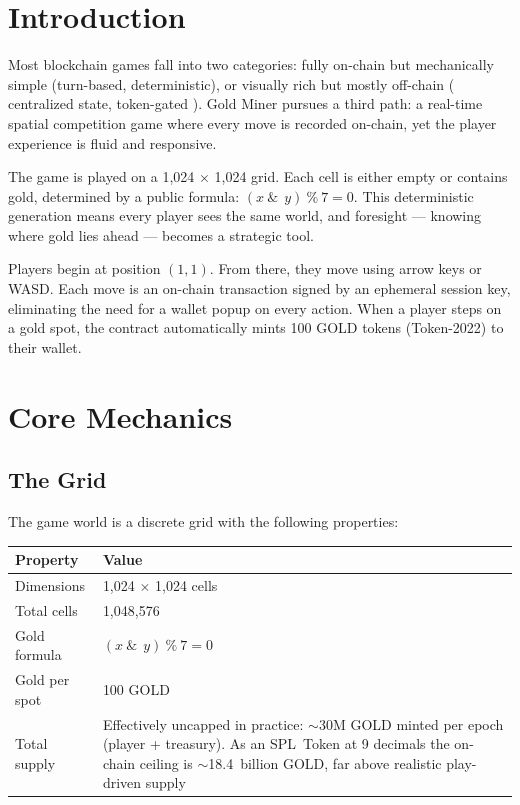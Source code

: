 \documentclass[11pt,a4paper]{article}
\begin{document}
\section{Introduction}

Most blockchain games fall into two categories: fully on-chain but mechanically simple (turn-based, deterministic), or visually rich but mostly off-chain ( centralized state, token-gated ). Gold Miner pursues a third path: a real-time spatial competition game where every move is recorded on-chain, yet the player experience is fluid and responsive.

The game is played on a 1,024 $\times$ 1,024 grid. Each cell is either empty or contains gold, determined by a public formula: $(x \ \&\ \ y) \ \% \ 7 = 0$. This deterministic generation means every player sees the same world, and foresight --- knowing where gold lies ahead --- becomes a strategic tool.

Players begin at position $(1,1)$. From there, they move using arrow keys or WASD. Each move is an on-chain transaction signed by an ephemeral session key, eliminating the need for a wallet popup on every action. When a player steps on a gold spot, the contract automatically mints 100 GOLD tokens (Token-2022) to their wallet.

\section{Core Mechanics}

\subsection{The Grid}

The game world is a discrete grid with the following properties:

\begin{table}[h]
\centering
\begin{tabular}{@{}lp{9.5cm}@{}}
\toprule
Property & Value \\
\midrule
Dimensions & 1,024 $\times$ 1,024 cells \\
Total cells & 1,048,576 \\
Gold formula & $(x \ \&\ \ y) \ \% \ 7 = 0$ \\
Gold per spot & 100 GOLD \\
Total supply & Effectively uncapped in practice: $\sim$30M GOLD minted per epoch (player + treasury). As an SPL~Token at 9 decimals the on-chain ceiling is $\sim$18.4~billion GOLD, far above realistic play-driven supply \\
\bottomrule
\end{tabular}
\end{table}
\end{document}
